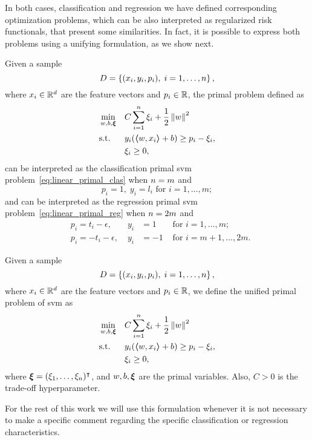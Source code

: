 In both cases, classification and regression we have defined corresponding optimization problems, which can be also interpreted as regularized risk functionals, that present some similarities. In fact, it is possible to express both problems using a unifying formulation, as we show next.
\begin{lemma}
    Given a sample
    $$ D = \left\{(x_i, y_i, p_i), \; i=1, \ldots, n\right\} ,$$
    where $x_i \in \mathbb{R}^d$ are the feature vectors and $p_i \in \mathbb{R}$, 
    the primal problem defined as
    \begin{equation}
        \nonumber
        \begin{aligned}
            &\min_{w, b, \bm{\xi}} & & C \sum_{i=1}^n \xi_i + \frac{1}{2} \left\lVert w\right\rVert^2 \\
            & \text{s.t.} & & y_i (\bm{\left\langle} w, x_i \bm{\right\rangle} + b) \geq p_i - \xi_i , \\
            & & & \xi_i \geq 0 ,      
        \end{aligned}  
    \end{equation}
    can be interpreted as the classification primal \acrshort{svm} problem~\eqref{eq:linear_primal_clas} when $n=m$ and
    $$ p_i = 1,\; y_i = l_i \text{ for } i=1, \ldots, m ;$$
    and can be interpreted as the regression primal \acrshort{svm} problem~\eqref{eq:linear_primal_reg} when $n = 2 m$ and
    \begin{equation}
        \nonumber
        \begin{aligned}
            & p_i = t_i - \epsilon ,\; &y_i &= 1 &\text{ for } i=1, \ldots, m ; \\
            & p_i = -t_i - \epsilon ,\; &y_i &= -1 &\text{ for } i=m+1, \ldots, 2m .
        \end{aligned}
    \end{equation}
\end{lemma}
%
\begin{definition}
    Given a sample
    $$ D = \left\{(x_i, y_i, p_i), \; i=1, \ldots, n\right\} ,$$
    where $x_i \in \mathbb{R}^d$ are the feature vectors and $p_i \in \mathbb{R}$, 
    we define the unified primal problem of \acrshort{svm} as
    \begin{equation}
        \label{eq:linear_primal}
        \begin{aligned}
            &\min_{w, b, \fv{\xi}} & & C \sum_{i=1}^\nsamples \xi_i + \frac{1}{2} \norm{w}^2 \\
            & \text{s.t.} & & y_i (\dotp{w}{x_i} + b) \geq p_i - \xi_i , \\
            & & & \xi_i \geq 0 ,      
        \end{aligned}  
    \end{equation}
    where $\bm{\xi} = (\xi_1, \ldots, \xi_n)^\intercal$, and $w, b, \bm{\xi}$ are the primal variables. Also, $C > 0$ is the trade-off hyperparameter.
\end{definition}
%
For the rest of this work we will use this formulation whenever it is not necessary to make a specific comment regarding the specific classification or regression characteristics.

